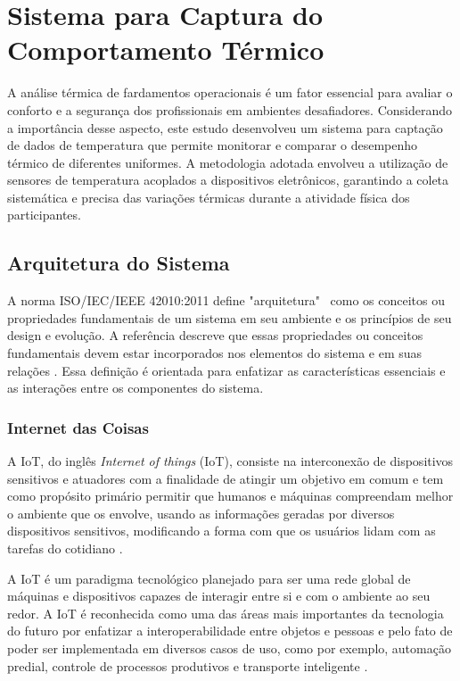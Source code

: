 \chapter{Sistema para Captura do Comportamento Térmico}
A análise térmica de fardamentos operacionais é um fator essencial para avaliar o conforto e 
a segurança dos profissionais em ambientes desafiadores. Considerando a importância desse aspecto, 
este estudo desenvolveu um sistema para captação de dados de temperatura que permite monitorar 
e comparar o desempenho térmico de diferentes uniformes. A metodologia adotada envolveu a 
utilização de sensores de temperatura acoplados a dispositivos eletrônicos, garantindo a coleta 
sistemática e precisa das variações térmicas durante a atividade física dos participantes.


\section{Arquitetura do Sistema}

A norma ISO/IEC/IEEE 42010:2011 define "arquitetura"~ como os conceitos ou propriedades fundamentais de um sistema em seu ambiente e os princípios de seu design e evolução. A referência descreve que essas propriedades ou conceitos fundamentais devem estar incorporados nos elementos do sistema e em suas relações \cite{ISO42010}. Essa definição é orientada para enfatizar as características essenciais e as interações entre os componentes do sistema.

\subsection{Internet das Coisas}

	A \acrlong{IoT}, do inglês \textit{Internet of things} (\acrshort{IoT}), consiste na interconexão de dispositivos sensitivos e atuadores com a finalidade de atingir um
	 objetivo em comum \cite{giusto2010internet} e tem como propósito primário permitir que humanos e máquinas compreendam melhor o ambiente que os envolve,
	  usando as informações geradas por diversos dispositivos sensitivos, modificando a forma com que os usuários lidam com as tarefas do cotidiano \cite{atzori2010internet}.
	
	A \acrshort{IoT} é um paradigma tecnológico planejado para ser uma rede global de máquinas e dispositivos capazes de interagir entre si e com o ambiente ao
	 seu redor. A \acrshort{IoT} é reconhecida como uma das áreas mais importantes da tecnologia do futuro por enfatizar a interoperabilidade entre objetos e pessoas
	  e pelo fato de poder ser implementada em diversos casos de uso, como por exemplo, automação predial, controle de processos produtivos e transporte inteligente \cite{gubbi2013internet}.
	
